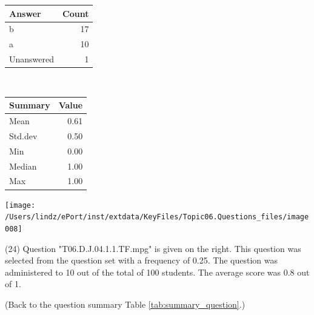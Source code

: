 \documentclass[12pt,nohyper]{tufte-handout}\usepackage[]{graphicx}\usepackage[]{color}
\begin{document}
\begin{center}%
\begin{tabular}{lr}
  \hline
Answer & Count \\ 
  \hline
b &  17 \\ 
  a &  10 \\ 
  Unanswered &   1 \\ 
   \hline
\end{tabular}
~~~~~~~~%
\begin{tabular}{lr}
  \hline
Summary & Value \\ 
  \hline
Mean & 0.61 \\ 
  Std.dev & 0.50 \\ 
  Min & 0.00 \\ 
  Median & 1.00 \\ 
  Max & 1.00 \\ 
   \hline
\end{tabular}
\end{center}\newpage{}



\vspace{5cm}\begin{marginfigure}\texttt{[image: /Users/lindz/ePort/inst/extdata/KeyFiles/Topic06.Questions\_files/image008]}\end{marginfigure}\vspace{-5cm} (24) Question "T06.D.J.04.1.1.TF.mpg" is given on the right. This question was selected from the question set with a frequency of 0.25. The question was administered to 10 out of the total of 100 students. The average score was 0.8 out of 1.

 (Back to the question summary Table \ref{tab:summary_question}.)
\end{document}
